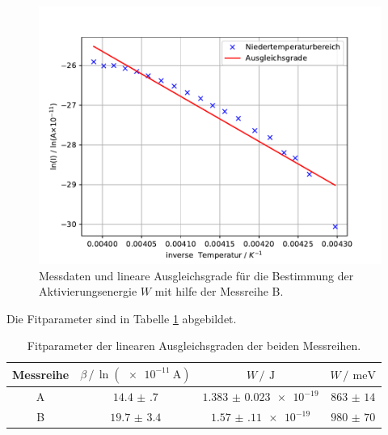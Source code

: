 \begin{figure}
    \centering
    \includegraphics[width=\textwidth,keepaspectratio]{figure/LinFit_W_B.pdf}
    \caption{Messdaten und lineare Ausgleichsgrade für die Bestimmung der Aktivierungsenergie $W$ mit hilfe der Messreihe B.}
    \label{fig:Lin_fit_W_B}
\end{figure}
\FloatBarrier
Die Fitparameter sind in Tabelle \ref{tab:Niedertemperatur_approx_fit_params} abgebildet.
\begin{table}
    \centering
    \caption{Fitparameter der linearen Ausgleichsgraden der beiden Messreihen.}
    \label{tab:Niedertemperatur_approx_fit_params}
    \begin{tabular}{c c c c}
        \toprule
        Messreihe & $\beta \,/\, \ln(\SI{e-11}{\ampere})$&$W \,/\,\SI{}{\joule}$&$W \,/\,\SI{}{\milli\eV}$\\
        \midrule
        A&$\num{14.4(7)}$&$\num{1.383(23)e-19}$&$\num{863(14)}$\\
        B&$\num{19.7(34)}$&$\num{1.57(11)e-19}$&$\num{980(70)}$\\
        \bottomrule
    \end{tabular}
\end{table}
